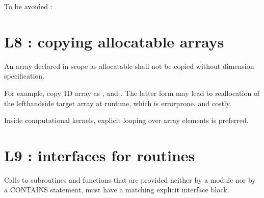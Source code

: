 \documentclass[letterpaper,10pt,english]{sphinxmanual}
\begin{document}
\sphinxAtStartPar
To be avoided :
\def\sphinxLiteralBlockLabel{\label{\detokenize{rules/L7:id1}}}
\begin{sphinxVerbatim}[commandchars=\\\{\}]



\end{sphinxVerbatim}

\sphinxstepscope


\section{L8 : copying allocatable arrays}
\label{\detokenize{rules/L8:l8-copying-allocatable-arrays}}\label{\detokenize{rules/L8::doc}}
\sphinxAtStartPar
An array declared in scope as allocatable shall not be copied without dimension specification.

\sphinxAtStartPar
For example, copy 1D array as , and  .
The latter form may lead to reallocation of the left\sphinxhyphen{}hand\sphinxhyphen{}side target array at runtime, which
is error\sphinxhyphen{}prone, and costly.

\sphinxAtStartPar
Inside computational kernels, explicit looping over array elements is preferred.

\sphinxstepscope


\section{L9 : interfaces for routines}
\label{\detokenize{rules/L9:l9-interfaces-for-routines}}\label{\detokenize{rules/L9::doc}}
\sphinxAtStartPar
Calls to subroutines and functions that are provided neither by a module nor by a CONTAINS statement,
must have a matching explicit interface block.
\end{document}
